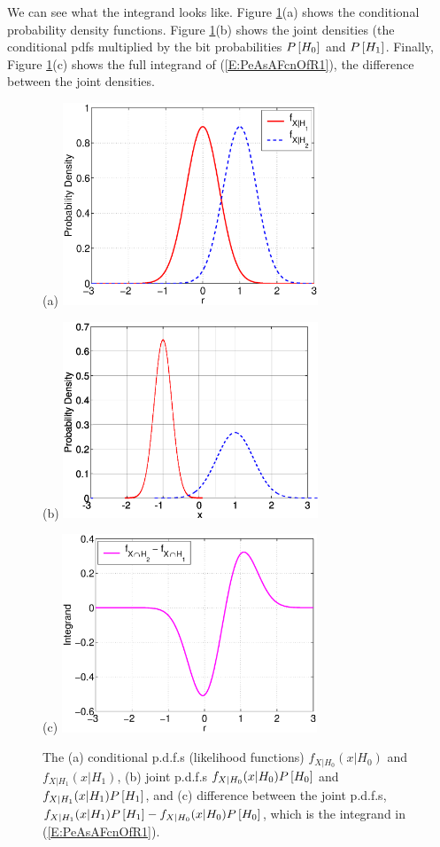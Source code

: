 We can see what the integrand looks like.  Figure
\ref{F:plotLikelihoodFunctionsBinaryRx}(a) shows the conditional
probability density functions.  Figure \ref{F:plotLikelihoodFunctionsBinaryRx}(b)
shows the joint densities (the conditional pdfs multiplied by the
bit probabilities $P\left[{H_0}\right]$ and $P\left[{H_1}\right]$.  Finally, Figure
\ref{F:plotLikelihoodFunctionsBinaryRx}(c) shows the full integrand of
(\ref{E:PeAsAFcnOfR1}), the difference between the joint densities.
\begin{figure}[htbp]
  \centerline{(a) \includegraphics[width=3in]{../images/plotLikelihoodFunctionsBinaryRx.eps}}
  \centerline{(b) \includegraphics[width=3in]{../images/plotJointDensities.eps}}
  \centerline{(c) \includegraphics[width=3in]{../images/plotJointDensityDifference.eps}}
  \caption{The (a) conditional p.d.f.s (likelihood functions) $f_{X|H_0}(x|H_0)$ and $f_{X|H_1}(x|H_1)$, (b) joint p.d.f.s $f_{X|H_0}(x|H_0)P\left[{H_0}\right]$ and $f_{X|H_1}(x|H_1)P\left[{H_1}\right]$, and (c) difference between the joint p.d.f.s,
  $f_{X|H_1}(x|H_1)P\left[{H_1}\right] - f_{X|H_0}(x|H_0)P\left[{H_0}\right]$,
  which is the integrand in (\ref{E:PeAsAFcnOfR1}).}
  \label{F:plotLikelihoodFunctionsBinaryRx}
\end{figure}
